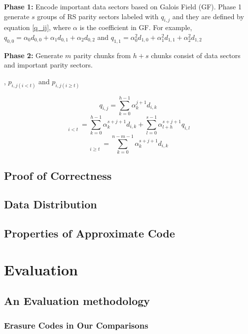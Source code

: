 \documentclass[conference]{IEEEtran}
\begin{document}
\textbf{Phase 1:} Encode important data sectors based on Galois Field (GF). Phase 1 generate $s$ groups of RS parity sectors labeled with $q_{i,j}$ and they are defined by equation \ref{q_ij}, where $\alpha$ is the coefficient in GF. 
For example, $q_{0,0} = \alpha_0 d_{0,0} + \alpha_1 d_{0,1} + \alpha_2 d_{0,2}$ and 
$q_{1,1} = \alpha_0^2 d_{1,0} + \alpha_1^2 d_{1,1} + \alpha_2^2 d_{1,2}$

\textbf{Phase 2:} Generate $m$ parity chunks from $h+s$ chunks consist of data sectors and important parity sectors. 


 , $p_{i,j(i<t)}$ and $p_{i,j(i \geqslant t)}$


\begin{equation}\label{q_ij}
    q_{i,j} = \sum_{k=0}^{h-1} \alpha_k^{j+1} d_{i,k}
\end{equation}
\begin{equation}
    \mathop{p_{i,j}}\limits_{i<t} = 
    \sum_{k=0}^{h-1} \alpha_k^{s+j+1} d_{i,k} +
    \sum_{l=0}^{s-1} \alpha_{l+h}^{s+j+1} q_{i,l}
\end{equation}
\begin{equation}
    \mathop{p_{i,j}}\limits_{i \geqslant t} = 
    \sum_{k=0}^{n-m-1} \alpha_k^{s+j+1} d_{i,k}
\end{equation}



\subsection{Proof of Correctness}
\subsection{Data Distribution}\label{Data Distribution}
\subsection{Properties of Approximate Code}

\section{Evaluation}
\subsection{An Evaluation methodology}
\subsubsection{Erasure Codes in Our Comparisons}
\end{document}
